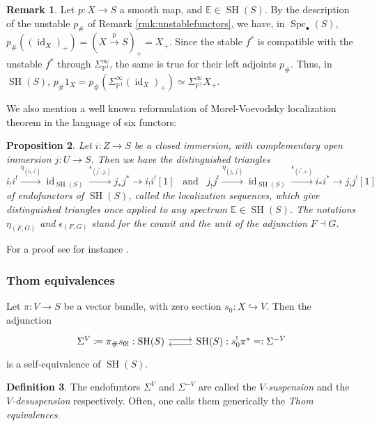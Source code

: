 \documentclass[10pt]{amsart}
\theoremstyle{definition}
\newtheorem{defn}{Definition}[section]
\newtheorem{rmk}[defn]{Remark}
\theoremstyle{plain}
\newtheorem{prop}[defn]{Proposition}
\numberwithin{equation}{section}
\newcommand{\0}{\emptyset}
\newcommand{\E}{{\mathbb E}}
\renewcommand{\P}{{\mathbb P}}
\newcommand{\SH}{{\operatorname{SH}}}
\newcommand{\Spc}{{\operatorname{Spc}}}
\newcommand{\id}{{\operatorname{id}}}
\begin{document}
\begin{rmk}
    Let $p:X \to S$ a smooth map, and $\E \in \SH(S)$. By the description of the unstable $p_\#$ of Remark \ref{rmk:unstablefunctors}, we have, in $\Spc_\bullet(S)$, $p_\#((\id_X)_+)=(X\xrightarrow{p}S)_+=X_+$. Since the stable $f^*$ is compatible with the unstable $f^*$ through $\Sigma^\infty_{\P^1}$, the same is true for their left adjoints $p_\#$. Thus, in $\SH(S)$, $p_\# 1_X = p_\# (\Sigma^\infty_{\P^1}(\id_X)_+) \simeq \Sigma_{\P^1}^\infty X_+$. 
\end{rmk}

We also mention a well known reformulation of Morel-Voevodsky localization theorem in the language of six functors:

\begin{prop}
\label{prop:localization}
    Let $i:Z \to S$ be a closed immersion, with complementary open immersion $j:U \to S$. Then we have the distinguished triangles
    $$i_!i^! \xrightarrow{\eta_{(i_!,i^!)}} \id_{\SH(S)} \xrightarrow{\epsilon_{(j^*,j_*)}} j_*j^* \to i_!i^![1] \; \; \; \text{and} \; \; \; j_!j^! \xrightarrow{\eta_{(j_!,j^!)}} \id_{\SH(S)} \xrightarrow{\epsilon_{(i^*,i_*)}} i_*i^* \to j_!j^![1]$$
    of endofunctors of $\SH(S)$, called the localization sequences, which give distinguished triangles once applied to any spectrum $\E \in \SH(S)$. The notations $\eta_{(F,G)}$ and $\epsilon_{(F,G)}$ stand for the counit and the unit of the adjunction $F \dashv G$.
\end{prop}

For a proof see for instance \cite[Corollary 3.2.3]{ayoub:sixfunctors}.

\subsubsection{Thom equivalences}
\label{subsection:thomequivalences}

Let $\pi:V \to S$ be a vector bundle, with zero section $s_0:X \hookrightarrow V$. Then the adjunction
$$
\begin{tikzcd}
    \Sigma^V \coloneqq \pi_\# s_{0!}: \SH(S) \arrow[r, shift left] & \SH(S): s_0^! \pi^* =: \Sigma^{-V} \arrow[l, shift left]
\end{tikzcd}
$$
is a self-equivalence of $\SH(S)$.
\begin{defn}
    The endofuntors $\Sigma^V$ and $\Sigma^{-V}$ are called the \emph{$V$-suspension} and the \emph{$V$-desuspension} respectively. Often, one calls them generically the \emph{Thom equivalences}.
\end{defn}
\end{document}
